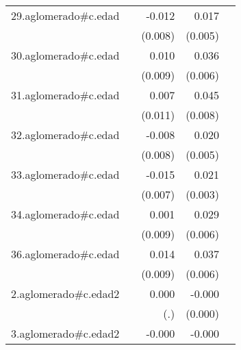 {\begin{longtable}{l*{4}{D{.}{.}{-1}}}
\addlinespace
29.aglomerado#c.edad&                     &      -0.012         &       0.017\sym{***}&                     \\
            &                     &     (0.008)         &     (0.005)         &                     \\
\addlinespace
30.aglomerado#c.edad&                     &       0.010         &       0.036\sym{***}&                     \\
            &                     &     (0.009)         &     (0.006)         &                     \\
\addlinespace
31.aglomerado#c.edad&                     &       0.007         &       0.045\sym{***}&                     \\
            &                     &     (0.011)         &     (0.008)         &                     \\
\addlinespace
32.aglomerado#c.edad&                     &      -0.008         &       0.020\sym{***}&                     \\
            &                     &     (0.008)         &     (0.005)         &                     \\
\addlinespace
33.aglomerado#c.edad&                     &      -0.015\sym{*}  &       0.021\sym{***}&                     \\
            &                     &     (0.007)         &     (0.003)         &                     \\
\addlinespace
34.aglomerado#c.edad&                     &       0.001         &       0.029\sym{***}&                     \\
            &                     &     (0.009)         &     (0.006)         &                     \\
\addlinespace
36.aglomerado#c.edad&                     &       0.014         &       0.037\sym{***}&                     \\
            &                     &     (0.009)         &     (0.006)         &                     \\
\addlinespace
2.aglomerado#c.edad2&                     &       0.000         &      -0.000\sym{**} &                     \\
            &                     &         (.)         &     (0.000)         &                     \\
\addlinespace
3.aglomerado#c.edad2&                     &      -0.000         &      -0.000\sym{***}&                     \\

\end{longtable}}
